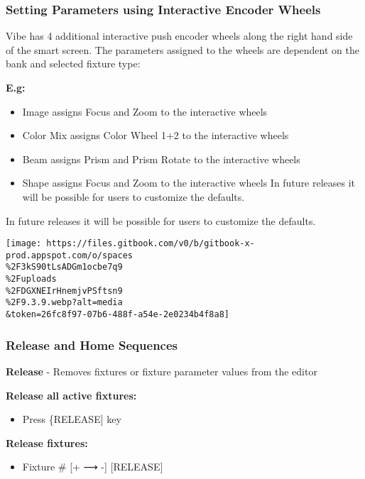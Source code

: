 \documentclass[
]{article}
\providecommand{\tightlist}{%
  \setlength{\itemsep}{0pt}\setlength{\parskip}{0pt}}
\begin{document}
\hypertarget{setting-parameters-using-interactive-encoder-wheels}{%
\subsubsection{Setting Parameters using Interactive Encoder Wheels}\label{setting-parameters-using-interactive-encoder-wheels}}

Vibe has 4 additional interactive push encoder wheels along the right hand side of the smart screen. The parameters assigned to the wheels are dependent on the bank and selected fixture type:

\textbf{E.g:}

\begin{itemize}
\item
  Image assigns Focus and Zoom to the interactive wheels
\item
  Color Mix assigns Color Wheel 1+2 to the interactive wheels
\item
  Beam assigns Prism and Prism Rotate to the interactive wheels
\item
  Shape assigns Focus and Zoom to the interactive wheels In future releases it will be possible for users to customize the defaults.
\end{itemize}

In future releases it will be possible for users to customize the defaults.

\texttt{[image: https://files.gitbook.com/v0/b/gitbook-x-prod.appspot.com/o/spaces\\\%2F3kS90tLsADGm1ocbe7q9\\\%2Fuploads\\\%2FDGXNEIrHnemjvPSftsn9\\\%2F9.3.9.webp?alt=media\\\&token=26fc8f97-07b6-488f-a54e-2e0234b4f8a8]}

\hypertarget{release-and-home-sequences}{%
\subsubsection{Release and Home Sequences}\label{release-and-home-sequences}}

\textbf{Release} - Removes fixtures or fixture parameter values from the editor

\textbf{Release all active fixtures:}

\begin{itemize}
\tightlist
\item
  Press \{RELEASE{]} key
\end{itemize}

\textbf{Release fixtures:}

\begin{itemize}
\tightlist
\item
  Fixture \# {[}+ ⟶ -{]} {[}RELEASE{]}
\end{itemize}
\end{document}
